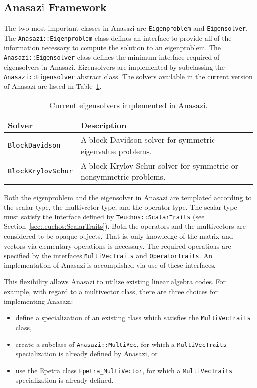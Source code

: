 \subsection{Anasazi Framework}
\label{sec:anasazi:framework}


The two most important classes in Anasazi are \verb!Eigenproblem! and
\verb!Eigensolver!. The \verb!Anasazi::Eigenproblem! class defines an interface
to provide all of the information necessary to compute the solution to an
eigenproblem. The \verb!Anasazi::Eigensolver! class defines the minimum
interface required of eigensolvers in Anasazi. Eigensolvers are implemented by
subclassing the \verb!Anasazi::Eigensolver! abstract class. The solvers
available in the current version of Anasazi are listed in
Table~\ref{tab:anasazi:solvers}.


\begin{table}[htp]
\begin{center}
\begin{tabular}{| p{4cm} p{8cm} |}
\hline
Solver & Description \\
\hline
{\tt BlockDavidson}    & A block Davidson solver for symmetric
                         eigenvalue problems.\\
{\tt BlockKrylovSchur} & A block Krylov Schur solver for symmetric or
                         nonsymmetric problems.\\
\hline
\end{tabular}
\caption{Current eigensolvers implemented in Anasazi.}
\label{tab:anasazi:solvers}
\end{center}
\end{table}


Both the eigenproblem and the eigensolver in Anasazi are templated according to
the scalar type, the multivector type, and the operator type. The scalar type
must satisfy the interface defined by \verb!Teuchos::ScalarTraits! (see
Section~\ref{sec:teuchos:ScalarTraits}). Both the operators and the
multivectors are considered to be opaque objects. That is, only knowledge of
the matrix and vectors via elementary operations is necessary. The required
operations are specified by the interfaces \verb!MultiVecTraits! and
\verb!OperatorTraits!. An implementation of Anasazi is accomplished via use of
these interfaces. 

This flexibility allows Anasazi to utilize existing linear algebra
codes. For example, with regard to a multivector class, there are
three choices for implementing Anasazi:
\begin{itemize}
\item define a specialization of an existing class which satisfies the
\verb!MultiVecTraits! class,
\item create a subclass of \verb!Anasazi::MultiVec!, for which a
\verb!MultiVecTraits! specialization is already defined by Anasazi, or
\item use the Epetra class \verb!Epetra_MultiVector!, for which a
\verb!MultiVecTraits! specialization is already defined.
\end{itemize}

